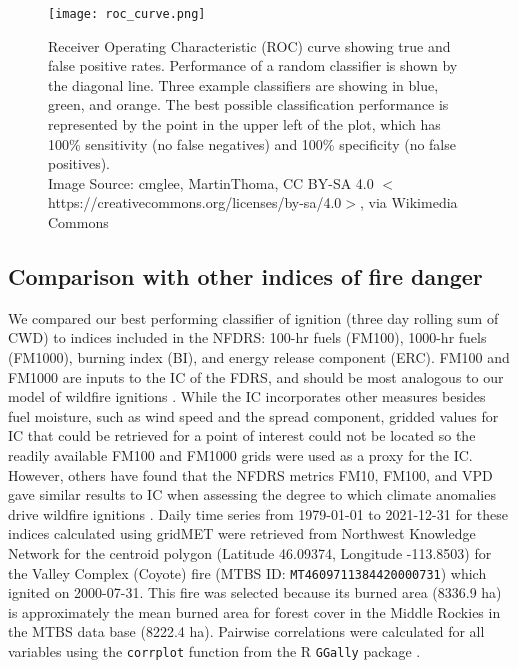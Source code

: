\documentclass[11p]{article}
\begin{document}
\begin{figure}[htbp]
  \centering
  \texttt{[image: roc\_curve.png]}
  \caption{Receiver Operating Characteristic (ROC) curve showing true and false positive rates. Performance of a random classifier is shown by the diagonal line. Three example classifiers are showing in blue, green, and orange. The best possible classification performance is represented by the point in the upper left of the plot, which has 100\% sensitivity (no false negatives) and 100\% specificity (no false positives). \\ Image Source: cmglee, MartinThoma, CC BY-SA 4.0 $<$https://creativecommons.org/licenses/by-sa/4.0$>$, via Wikimedia Commons}
    \label{fig:roc}
\end{figure}

\subsection{Comparison with other indices of fire danger}

We compared our best performing classifier of ignition (three day rolling sum of CWD) to indices included in the NFDRS: 100-hr fuels (FM100), 1000-hr fuels (FM1000), burning index (BI), and energy release component (ERC).  FM100 and FM1000 are inputs to the IC of the FDRS, and should be most analogous to our model of wildfire ignitions \citep{jollyModernizingUSNational2024}. While the IC incorporates other measures besides fuel moisture, such as wind speed and the spread component, gridded values for IC that could be retrieved for a point of interest could not be located so the readily available FM100 and FM1000 grids were used as a proxy for the IC. However, others have found that the NFDRS metrics FM10, FM100, and VPD gave similar results to IC when assessing the degree to which climate anomalies drive wildfire ignitions \citep{jorgeCOVID19FueledElevated2025}. Daily time series from 1979-01-01 to 2021-12-31 for these indices calculated using gridMET were retrieved from Northwest Knowledge Network \citep{northwestknowledgenetworREACCHMETDATAGRIDMET2025} for the centroid polygon (Latitude 46.09374, Longitude -113.8503) for the Valley Complex (Coyote) fire (MTBS ID: \texttt{MT4609711384420000731}) which ignited on 2000-07-31. This fire was selected because its burned area (8336.9 ha) is approximately the mean burned area for forest cover in the Middle Rockies in the MTBS data base (8222.4 ha). Pairwise correlations were calculated for all variables using the \texttt{corrplot} function from the R \texttt{GGally} package \citep{schloerkeGGallyExtensionGgplot22024}.
\end{document}
